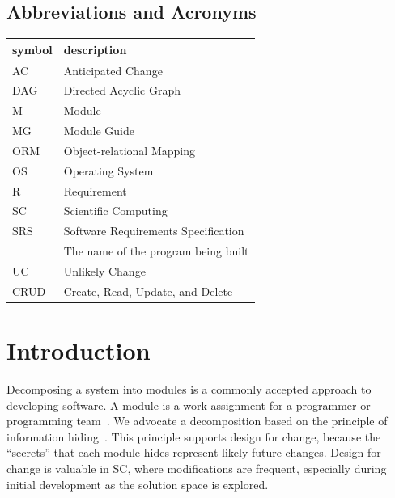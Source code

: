 \documentclass[12pt, titlepage]{article}
\begin{document}
\subsection{Abbreviations and Acronyms}

\renewcommand{\arraystretch}{1.2}
\begin{tabular}{l l}
	\toprule
	\textbf{symbol} & \textbf{description}                \\
	\midrule
	AC              & Anticipated Change                  \\
	DAG             & Directed Acyclic Graph              \\
	M               & Module                              \\
	MG              & Module Guide                        \\
	ORM             & Object-relational Mapping           \\
	OS              & Operating System                    \\
	R               & Requirement                         \\
	SC              & Scientific Computing                \\
	SRS             & Software Requirements Specification \\
	\progname       & The name of the program being built \\
	UC              & Unlikely Change                     \\
	CRUD            & Create, Read, Update, and Delete    \\
	\bottomrule
\end{tabular}

\newpage

\tableofcontents

\newpage

\listoftables

\listoffigures

\newpage


\section{Introduction}

Decomposing a system into modules is a commonly accepted approach to developing software. A module
is a work assignment for a programmer or programming team~\citep{ParnasEtAl1984}. We advocate a
decomposition based on the principle of information hiding~\citep{Parnas1972a}. This principle
supports design for change, because the ``secrets'' that each module hides represent likely future
changes. Design for change is valuable in SC, where modifications are frequent, especially during
initial development as the solution space is explored.
\end{document}
